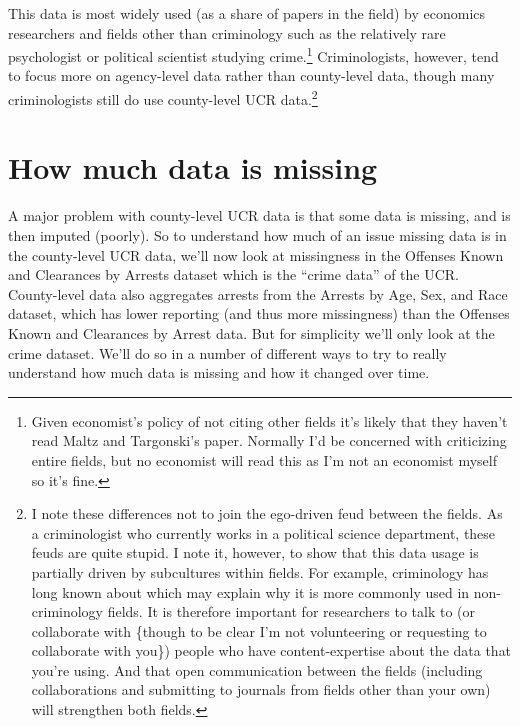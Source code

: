 \documentclass[
  12pt,
  openany]{book}
\begin{document}
This data is most widely used (as a share of papers in the field) by economics researchers and fields other than criminology such as the relatively rare psychologist or political scientist studying crime.\footnote{Given economist's policy of not citing other fields it's likely that they haven't read Maltz and Targonski's paper. Normally I'd be concerned with criticizing entire fields, but no economist will read this as I'm not an economist myself so it's fine.} Criminologists, however, tend to focus more on agency-level data rather than county-level data, though many criminologists still do use county-level UCR data.\footnote{I note these differences not to join the ego-driven feud between the fields. As a criminologist who currently works in a political science department, these feuds are quite stupid. I note it, however, to show that this data usage is partially driven by subcultures within fields. For example, criminology has long known about which may explain why it is more commonly used in non-criminology fields. It is therefore important for researchers to talk to (or collaborate with \{though to be clear I'm not volunteering or requesting to collaborate with you\}) people who have content-expertise about the data that you're using. And that open communication between the fields (including collaborations and submitting to journals from fields other than your own) will strengthen both fields.}

\hypertarget{how-much-data-is-missing}{%
\section{How much data is missing}\label{how-much-data-is-missing}}

A major problem with county-level UCR data is that some data is missing, and is then imputed (poorly). So to understand how much of an issue missing data is in the county-level UCR data, we'll now look at missingness in the Offenses Known and Clearances by Arrests dataset which is the ``crime data'' of the UCR. County-level data also aggregates arrests from the Arrests by Age, Sex, and Race dataset, which has lower reporting (and thus more missingness) than the Offenses Known and Clearances by Arrest data. But for simplicity we'll only look at the crime dataset. We'll do so in a number of different ways to try to really understand how much data is missing and how it changed over time.
\end{document}
